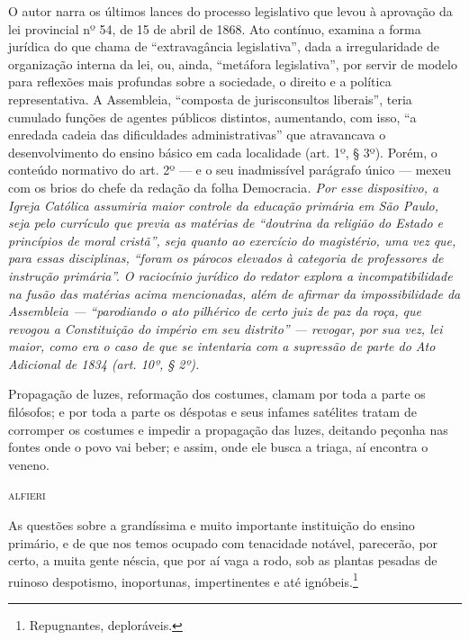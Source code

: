 \begin{didascalia}
O autor narra os últimos lances do processo legislativo que levou à
aprovação da lei provincial nº 54, de 15 de abril de 1868. Ato contínuo, examina
a forma jurídica do que chama de ``extravagância legislativa'', dada a
irregularidade de organização interna da lei, ou, ainda, ``metáfora
legislativa'', por servir de modelo para reflexões mais profundas sobre a
sociedade, o direito e a política representativa. A Assembleia,
``composta de jurisconsultos liberais'', teria cumulado funções de agentes
públicos distintos, aumentando, com isso, ``a enredada cadeia das
dificuldades administrativas'' que atravancava o desenvolvimento do
ensino básico em cada localidade (art. 1º, § 3º). Porém, o conteúdo
normativo do art. 2º --- e o seu inadmissível parágrafo único --- mexeu
com os brios do chefe da redação da folha Democracia\emph{. Por esse
dispositivo, a Igreja Católica assumiria maior controle da educação
primária em São Paulo, seja pelo currículo que previa as matérias de
``doutrina da religião do Estado e princípios de moral cristã'', seja
quanto ao exercício do magistério, uma vez que, para essas disciplinas,
``foram os párocos elevados à categoria de professores de instrução
primária''. O raciocínio jurídico do redator explora a incompatibilidade
na fusão das matérias acima mencionadas, além de afirmar da
impossibilidade da Assembleia --- ``parodiando o ato pilhérico de certo
juiz de paz da roça, que revogou a Constituição do império em seu
distrito'' --- revogar, por sua vez, lei maior, como era o caso de que se
intentaria com a supressão de parte do Ato Adicional de 1834 (art. 10º,
§ 2º).}
\end{didascalia}



\epigraph{Propagação de luzes, reformação dos costumes, clamam por toda a parte os
filósofos; e por toda a parte os déspotas e seus infames satélites
tratam de corromper os costumes e impedir a propagação das luzes,
deitando peçonha nas fontes onde o povo vai beber; e assim, onde ele
busca a triaga,\footnotemark{} aí encontra o veneno.}{\textsc{alfieri}}



As questões sobre a grandíssima e muito importante instituição do ensino
primário, e de que nos temos ocupado com tenacidade notável, parecerão,
por certo, a muita gente néscia, que por aí vaga a rodo, sob as plantas
pesadas de ruinoso despotismo, inoportunas, impertinentes e até
ignóbeis.\footnote{Repugnantes, deploráveis.}

